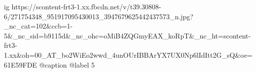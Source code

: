  
 
 
 
 

\ifcmt
  ig https://scontent-frt3-1.xx.fbcdn.net/v/t39.30808-6/271754348_951917095430013_3947679625442437573_n.jpg?_nc_cat=102&ccb=1-5&_nc_sid=b9115d&_nc_ohc=oMiB4ZQGmyEAX_koRpT&_nc_ht=scontent-frt3-1.xx&oh=00_AT_bo2WiEo2wwd_4unOUrIBBArYX7UX0Np6lIdItt2G_sQ&oe=61E59FDE
  @caption @label 5
\fi
